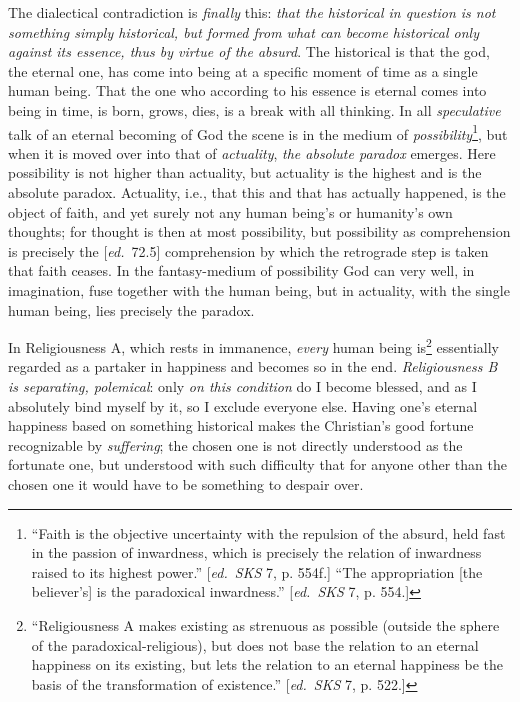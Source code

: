 \documentclass[12pt,a4paper,openany]{book}
\newcommand{\kpage}[1]{\marginnote{\footnotesize\textit{[#1]}}}
\newcommand{\ed}[1]{{\small[\textit{ed.}\ #1]}}
\begin{document}
The dialectical contradiction is \emph{finally} this: \emph{that the historical in
question is not something simply historical, but formed from what can become historical only against its
essence, thus by virtue of the absurd}. The historical is that
the god, the eternal one, has come into being at a specific moment of time as a
single human being. That the one who according to his essence is eternal comes into being in time,
\kpage{149}is born, grows, dies, is a break with all thinking. In all \emph{speculative} talk
of an eternal becoming of God the scene is in the medium of \emph{possibility}\footnote[77]{``Faith is the objective uncertainty with the repulsion of the absurd, held fast in the passion
of inwardness, which is precisely the relation of inwardness raised to its highest power.''
\ed{\emph{SKS} 7, p. 554f.} ``The appropriation [the believer's] is the paradoxical inwardness.'' \ed{\emph{SKS} 7,
p. 554.}}, but when
it is moved over into that of \emph{actuality}, \emph{the absolute paradox} emerges. Here
possibility is not higher than actuality, but actuality
is the highest and is the absolute paradox. Actuality, i.e., that
this and that has actually happened, is the object of faith, and yet surely not
any human being's or humanity's own thoughts; for thought is
then at most possibility, but possibility as comprehension is
precisely the \ed{72.5} comprehension by which the retrograde step is taken
that faith ceases. In the fantasy-medium of possibility God can very
well, in imagination, fuse together with the human being, but
in actuality, with the single human being, lies precisely the paradox.

In Religiousness A, which rests in immanence, \emph{every} human being
is\footnote[78]{``Religiousness A makes existing as strenuous as possible (outside the
sphere of the paradoxical-religious), but does not base the relation to an eternal happiness on
its existing, but lets the relation to an eternal happiness be the basis of the transformation of existence.''
\ed{\emph{SKS} 7, p. 522.}}
essentially regarded as a partaker in happiness and becomes so in the end. \emph{Religiousness
B is separating, polemical}: only \emph{on this condition} do I become blessed,
and as I absolutely bind myself by it, so I exclude
everyone else. Having one's eternal happiness based on something historical
makes the Christian's good fortune recognizable by \emph{suffering}; the chosen one
is not directly understood as the fortunate one, but understood with such
difficulty that for anyone other than the chosen one it would have to be something
to despair over.
\end{document}
